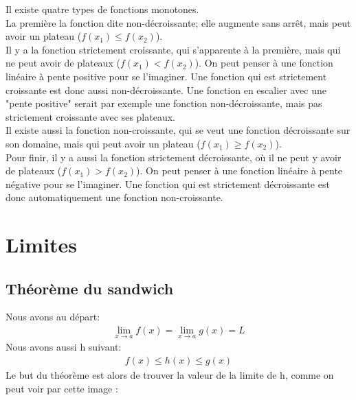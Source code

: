 \documentclass[10pt, french]{article}
\begin{document}
\begin{multicols*}{2}
\begin{definitionNOHFILL}
Il existe quatre types de fonctions monotones. \\
La première la fonction dite non-décroissante; elle augmente sans arrêt, mais peut avoir un plateau ($f(x_{1}) \leq f(x_{2})$). \\
Il y a la fonction strictement croissante, qui s'apparente à la première, mais qui ne peut avoir de plateaux ($f(x_{1}) < f(x_{2})$). On peut penser à une fonction linéaire à pente positive pour se l'imaginer. Une fonction qui est strictement croissante est donc aussi non-décroissante. Une fonction en escalier avec une "pente positive" serait par exemple une fonction non-décroissante, mais pas strictement croissante avec ses plateaux.\\
Il existe aussi la fonction non-croissante, qui se veut une fonction décroissante sur son domaine, mais qui peut avoir un plateau ($f(x_{1}) \geq f(x_{2})$). \\
Pour finir, il y a aussi la fonction strictement décroissante, où il ne peut y avoir de plateaux ($f(x_{1}) > f(x_{2})$). On peut penser à une fonction linéaire à pente négative pour se l'imaginer. Une fonction qui est strictement décroissante est donc automatiquement une fonction non-croissante.
\end{definitionNOHFILL}

\section{Limites}
\subsection{Théorème du sandwich}
Nous avons au départ:
  \begin{align*}
    \lim_{x \to a}  f(x) = \lim_{x \to a} g(x) = L
  \end{align*}
Nous avons aussi h suivant:
  \begin{align*}
    f(x) \leq h(x) \leq g(x)
  \end{align*}
  Le but du théorème est alors de trouver la valeur de la limite de h, comme on peut voir par cette image :


\end{multicols*}
\end{document}
